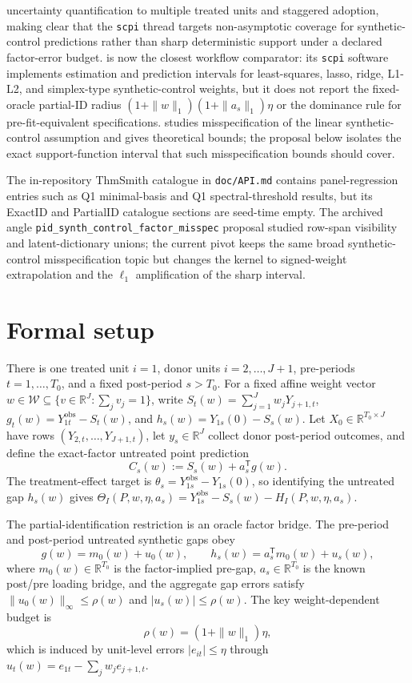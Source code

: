 \documentclass[11pt]{article}
\newcommand{\transpose}{\mathsf{T}}
\newcommand{\R}{\mathbb{R}}
\theoremstyle{definition}
\theoremstyle{plain}
\theoremstyle{remark}
\begin{document}
uncertainty quantification to multiple treated units and staggered adoption, making clear that the \texttt{scpi} thread targets non-asymptotic coverage for synthetic-control predictions rather than sharp deterministic support under a declared factor-error budget. \citet{CattaneoFengPalombaTitiunik2025JSS} is now the closest workflow comparator: its \texttt{scpi} software implements estimation and prediction intervals for least-squares, lasso, ridge, L1-L2, and simplex-type synthetic-control weights, but it does not report the fixed-oracle partial-ID radius \((1+\|w\|_1)(1+\|a_s\|_1)\eta\) or the dominance rule for pre-fit-equivalent specifications. \citet{NazaretShiBlei2024} studies misspecification of the linear synthetic-control assumption and gives theoretical bounds; the proposal below isolates the exact support-function interval that such misspecification bounds should cover.

The in-repository ThmSmith catalogue in \texttt{doc/API.md} contains panel-regression entries such as Q1 minimal-basis and Q1 spectral-threshold results, but its ExactID and PartialID catalogue sections are seed-time empty. The archived angle \texttt{pid\_synth\_control\_factor\_misspec} proposal studied row-span visibility and latent-dictionary unions; the current pivot keeps the same broad synthetic-control misspecification topic but changes the kernel to signed-weight extrapolation and the \(\ell_1\) amplification of the sharp interval.

\section{Formal setup}
There is one treated unit \(i=1\), donor units \(i=2,\ldots,J+1\), pre-periods \(t=1,\ldots,T_0\), and a fixed post-period \(s>T_0\). For a fixed affine weight vector \(w\in\mathcal{W}\subseteq\{v\in\R^J:\sum_jv_j=1\}\), write \(S_t(w)=\sum_{j=1}^Jw_jY_{j+1,t}\), \(g_t(w)=Y^{\mathrm{obs}}_{1t}-S_t(w)\), and \(h_s(w)=Y_{1s}(0)-S_s(w)\). Let \(X_0\in\R^{T_0\times J}\) have rows \((Y_{2,t},\ldots,Y_{J+1,t})\), let \(y_s\in\R^J\) collect donor post-period outcomes, and define the exact-factor untreated point prediction
\[
C_s(w):=S_s(w)+a_s^\transpose g(w).
\]
The treatment-effect target is \(\theta_s=Y^{\mathrm{obs}}_{1s}-Y_{1s}(0)\), so identifying the untreated gap \(h_s(w)\) gives \(\Theta_I(P,w,\eta,a_s)=Y^{\mathrm{obs}}_{1s}-S_s(w)-H_I(P,w,\eta,a_s)\).

The partial-identification restriction is an oracle factor bridge. The pre-period and post-period untreated synthetic gaps obey
\[
g(w)=m_0(w)+u_0(w),\qquad h_s(w)=a_s^\transpose m_0(w)+u_s(w),
\]
where \(m_0(w)\in\R^{T_0}\) is the factor-implied pre-gap, \(a_s\in\R^{T_0}\) is the known post/pre loading bridge, and the aggregate gap errors satisfy \(\|u_0(w)\|_\infty\le\rho(w)\) and \(|u_s(w)|\le\rho(w)\). The key weight-dependent budget is
\[
\rho(w)=(1+\|w\|_1)\eta,
\]
which is induced by unit-level errors \(|e_{it}|\le\eta\) through \(u_t(w)=e_{1t}-\sum_jw_je_{j+1,t}\).
\end{document}
